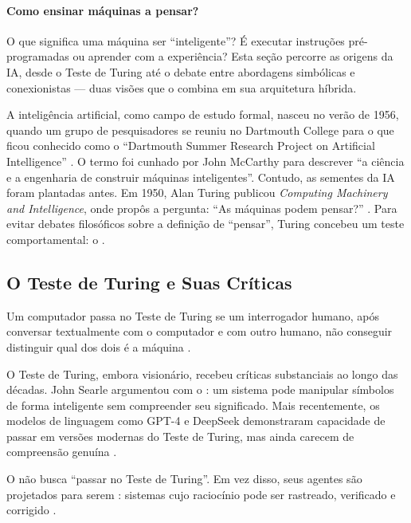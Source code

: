 \paragraph{Como ensinar máquinas a pensar?} O que significa uma máquina ser
``inteligente''? É executar instruções pré-programadas ou aprender com a
experiência? Esta seção percorre as origens da IA, desde o Teste de Turing
até o debate entre abordagens simbólicas e conexionistas --- duas visões que
o \opencodeeco{} combina em sua arquitetura híbrida.

A inteligência artificial, como campo de estudo formal, nasceu no verão de
1956, quando um grupo de pesquisadores se reuniu no Dartmouth College para o
que ficou conhecido como o ``Dartmouth Summer Research Project on Artificial
Intelligence'' \cite{mccarthy1955proposal}. O termo  foi cunhado por John McCarthy para descrever ``a ciência e a
engenharia de construir máquinas inteligentes''.
Contudo, as sementes da IA foram plantadas antes. Em 1950, Alan Turing
publicou \textit{Computing Machinery and Intelligence}, onde propôs a
pergunta: ``As máquinas podem pensar?'' \cite{turing1950computing}. Para
evitar debates filosóficos sobre a definição de ``pensar'', Turing concebeu
um teste comportamental: o .
\subsection{O Teste de Turing e Suas Críticas}
\begin{definicao}
Um computador passa no Teste de Turing se um interrogador humano, após
conversar textualmente com o computador e com outro humano, não conseguir
distinguir qual dos dois é a máquina \cite{turing1950computing}.
\end{definicao}
O Teste de Turing, embora visionário, recebeu críticas substanciais ao longo
das décadas. John Searle argumentou com o  \cite{russell2020inteligencia}: um sistema pode manipular símbolos
de forma inteligente sem compreender seu significado. Mais recentemente, os
modelos de linguagem como GPT-4 e DeepSeek demonstraram capacidade de
passar em versões modernas do Teste de Turing, mas ainda carecem de
compreensão genuína \cite{achiam2023gpt4, bender2021dangers}.
\begin{observacao}
O \opencodeeco{} não busca ``passar no Teste de Turing''. Em vez disso, seus
agentes são projetados para serem :
sistemas cujo raciocínio pode ser rastreado, verificado e corrigido
\cite{opencode2026ecosystem}.
\end{observacao}
